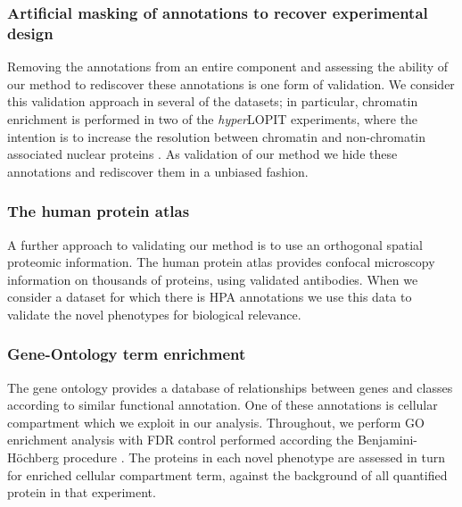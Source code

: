 \documentclass[12pt,english]{article}
\begin{document}
\subsubsection{Artificial masking of annotations to recover experimental design}
Removing the annotations from an entire component and assessing the ability of our method to rediscover these annotations is one form of validation. We consider this validation approach in several of the datasets; in particular, chromatin enrichment is performed in two of the \textit{hyper}LOPIT experiments, where the intention is to increase the resolution between chromatin and non-chromatin associated nuclear proteins \citep{Mulvey:2017}. As validation of our method we hide these annotations and rediscover them in a unbiased fashion.
\subsubsection{The human protein atlas}
A further approach to validating our method is to use an orthogonal spatial proteomic information. The human protein atlas \citep{Thul:2017, Sullivan:2018} provides confocal microscopy information on thousands of proteins, using validated antibodies. When we consider a dataset for which there is HPA annotations we use this data to validate the novel phenotypes for biological relevance. 
\subsubsection{Gene-Ontology term enrichment}
The gene ontology provides a database of relationships between genes and classes according to similar functional annotation. One of these annotations is cellular compartment which we exploit in our analysis. Throughout, we perform GO enrichment analysis with FDR control performed according the Benjamini-H\"ochberg procedure \citep{FDR:1995,Ashburner:2000,Yu:2012}. The proteins in each novel phenotype are assessed in turn for enriched cellular compartment term, against the background of all quantified protein in that experiment. 
\end{document}
